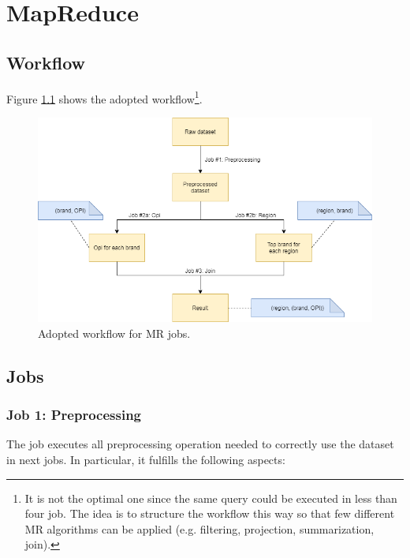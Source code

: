 \chapter{MapReduce}

\section{Workflow}

Figure \ref{fig:MR-workflow} shows the adopted workflow\footnote{It is not the optimal one since the same query could be executed in less than four job. The idea is to structure the workflow this way so that few different MR algorithms can be applied (e.g. filtering, projection, summarization, join). }.

\begin{figure}[H]
	\centering
	\includegraphics[scale=0.6]{images/2-mapreduce/MR-workflow.png}
	\caption{Adopted workflow for MR jobs.}
	\label{fig:MR-workflow}
\end{figure}

\section{Jobs}

\subsection{Job 1: Preprocessing}

The job executes all preprocessing operation needed to correctly use the dataset in next jobs. In particular, it fulfills the following aspects:

